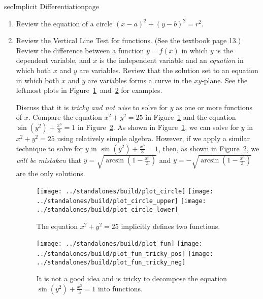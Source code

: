 \documentclass[../main]{subfiles}
\begin{document}
\begin{outline}{sec}{Implicit Differentiation}{page} \label{outline:implicit}
  \begin{enumerate}
    \item Review the equation of a circle \((x-a)^{2} + (y-b)^{2} = r^{2}\).
    \item Review the Vertical Line Test for functions. (See the textbook page 13.)  Review the difference between a function \(y = f(x)\) in which \(y\) is the dependent variable, and \(x\) is the independent variable and an \emph{equation} in which both \(x\) and \(y\) are variables. Review that the solution set to an equation in which both \(x\) and \(y\) are variables forms a curve in the \(xy\)-plane. See the leftmost plots in Figure~\ref{fig:circle}~and~\ref{fig:implicit_curves} for examples.

      Discuss that it is \emph{tricky and not wise} to solve for \(y\) as one or more functions of \(x\). Compare the equation \(x^{2} + y^{2} = 25\) in Figure~\ref{fig:circle} and the equation \(\sin(y^{2}) + \frac{x^{3}}{3} = 1\) in Figure~\ref{fig:implicit_curves}. As shown in Figure~\ref{fig:circle}, we can solve for \(y\) in \(x^{2} + y^{2} = 25\) using relatively simple algebra. However, if we apply a similar technique to solve for \(y\) in \(\sin(y^{2}) + \frac{x^{3}}{3} = 1\), then, as shown in Figure~\ref{fig:implicit_curves}, we \emph{will be mistaken} that \(y = \sqrt{\arcsin(1 - \frac{x^{3}}{3})}\) and \(y = -\sqrt{\arcsin(1 - \frac{x^{3}}{3})}\) are the only solutions.

      \begin{figure}[h]
        \centering
        \centerline{
          \texttt{[image: ../standalones/build/plot\_circle]}
          \texttt{[image: ../standalones/build/plot\_circle\_upper]}
          \texttt{[image: ../standalones/build/plot\_circle\_lower]}
        }
        \caption{The equation \(x^{2} + y^{2} = 25\) implicitly defines two functions.}
        \label{fig:circle}
      \end{figure}


      \begin{figure}[h]
        \centering
        \centerline{
          \texttt{[image: ../standalones/build/plot\_fun]}
          \texttt{[image: ../standalones/build/plot\_fun\_tricky\_pos]}
          \texttt{[image: ../standalones/build/plot\_fun\_tricky\_neg]}
        }
        \caption{It is not a good idea and is tricky to decompose the equation \(\sin(y^{2}) + \frac{x^{3}}{3} = 1\) into functions. }
        \label{fig:implicit_curves}
      \end{figure}


\end{enumerate}
\end{outline}
\end{document}
